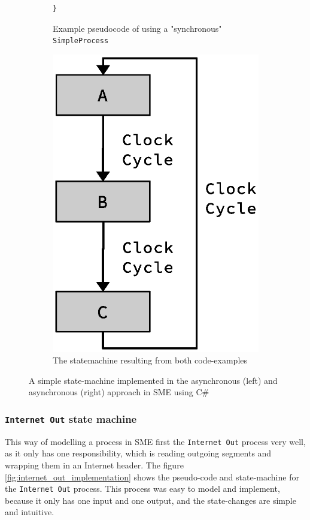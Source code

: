 \begin{figure}
\begin{subfigure}[b]{0.3\textwidth}
\begin{lstlisting}[language={[Sharp]C}]
}
\end{lstlisting}
	\caption{Example pseudocode of using a "synchronous" \texttt{SimpleProcess}}
	\label{fig:sme_example_process_sync_code}
    \end{subfigure}
\hfill
 \begin{subfigure}[b]{0.3\textwidth}
        \centering
        \includegraphics[scale=0.45]{implementation/empty_process_fsm.eps}
        \caption{The statemachine resulting from both code-examples}
 	\label{fig:sme_example_process_fsm}
\end{subfigure}
    \caption{A simple state-machine implemented in the asynchronous (left) and
asynchronous (right) approach in SME using C\#}
    \label{fig:example_fsm}
\end{figure}


\subsubsection{\texttt{Internet Out} state machine}
This way of modelling a process in SME first the \texttt{Internet Out} process
very well, as it only has one responsibility, which is reading outgoing segments
and wrapping them in an Internet header. The figure \ref{fig:internet_out_implementation} shows the pseudo-code and state-machine for the \texttt{Internet Out}
process. This process was easy to model and implement, because it only has one
input and one output, and the state-changes are simple and intuitive.

